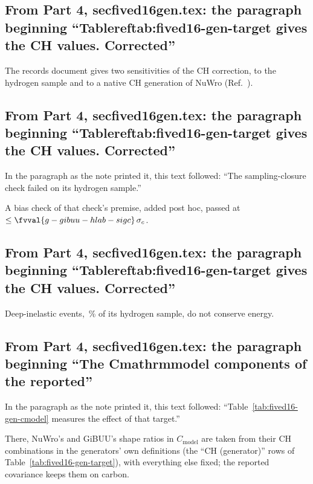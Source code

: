 \subsection{From Part 4, secfived16gen.tex: the paragraph beginning ``Tablereftab:fived16-gen-target gives the CH values. Corrected''}
The records document gives two sensitivities of the CH correction, to the hydrogen sample and to a native CH generation of NuWro (Ref.~\cite{NoteRecords2026}).

\subsection{From Part 4, secfived16gen.tex: the paragraph beginning ``Tablereftab:fived16-gen-target gives the CH values. Corrected''}
In the paragraph as the note printed it, this text followed: ``The sampling-closure check failed on its hydrogen sample.''\par
A bias check of that check's premise, added post hoc, passed at $\le\fvval{g-gibuu-hlab-sigc}\,\sigma_c$.

\subsection{From Part 4, secfived16gen.tex: the paragraph beginning ``Tablereftab:fived16-gen-target gives the CH values. Corrected''}
Deep-inelastic events, \,\% of its hydrogen sample, do not conserve energy.

\subsection{From Part 4, secfived16gen.tex: the paragraph beginning ``The Cmathrmmodel components of the reported''}
In the paragraph as the note printed it, this text followed: ``Table~\ref{tab:fived16-gen-cmodel} measures the effect of that target.''\par
There, NuWro's and GiBUU's shape ratios in $C_{\mathrm{model}}$ are taken from their CH combinations in the generators' own definitions (the ``CH (generator)'' rows of Table~\ref{tab:fived16-gen-target}), with everything else fixed; the reported covariance keeps them on carbon.


